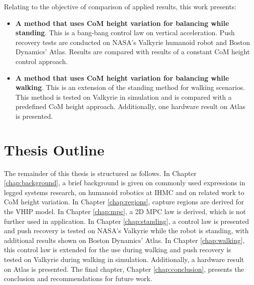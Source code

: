 Relating to the objective of comparison of applied results, this work presents:
\begin{itemize}
	\item \textbf{A method that uses \ac{CoM} height variation for balancing while standing}. This is a bang-bang control law on vertical acceleration. Push recovery tests are conducted on NASA's Valkyrie humanoid robot and Boston Dynamics' Atlas. Results are compared with results of a constant \ac{CoM} height control approach.
	\item \textbf{A method that uses \ac{CoM} height variation for balancing while walking}. This is an extension of the standing method for walking scenarios. This method is tested on Valkyrie in simulation and is compared with a predefined \ac{CoM} height approach. Additionally, one hardware result on Atlas is presented.
\end{itemize}
\section{Thesis Outline}
The remainder of this thesis is structured as follows. In Chapter \ref{chap:background}, a brief background is given on commonly used expressions in legged systems research, on humanoid robotics at \ac{IHMC} and on related work to \ac{CoM} height variation. In Chapter \ref{chap:regions}, capture regions are derived for the \ac{VHIP} model. In Chapter \ref{chap:mpc}, a \ac{2D} \ac{MPC} law is derived, which is not further used in application. In Chapter \ref{chap:standing}, a control law is presented and push recovery is tested on NASA's Valkyrie while the robot is standing, with additional results shown on Boston Dynamics' Atlas. In Chapter \ref{chap:walking}, this control law is extended for the use during walking and push recovery is tested on Valkyrie during walking in simulation. Additionally, a hardware result on Atlas is presented. The final chapter, Chapter \ref{chap:conclusion}, presents the conclusion and recommendations for future work.


